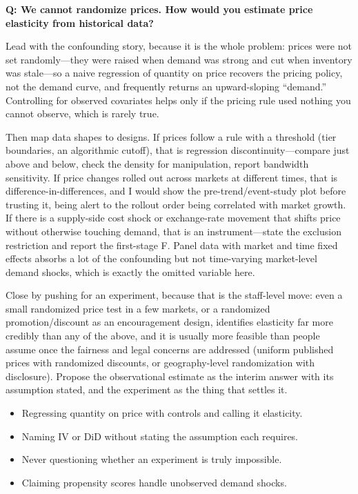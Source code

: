 \begin{interviewq}
\textbf{Q: We cannot randomize prices. How would you estimate price elasticity from historical data?}

 \quad {} \quad \badgefreq{\freqmed}

\stronganswer

Lead with the confounding story, because it is the whole problem: prices were not set randomly---they were raised when demand was strong and cut when inventory was stale---so a naive regression of quantity on price recovers the pricing policy, not the demand curve, and frequently returns an upward-sloping ``demand.'' Controlling for observed covariates helps only if the pricing rule used nothing you cannot observe, which is rarely true.

Then map data shapes to designs. If prices follow a rule with a threshold (tier boundaries, an algorithmic cutoff), that is regression discontinuity---compare just above and below, check the density for manipulation, report bandwidth sensitivity. If price changes rolled out across markets at different times, that is difference-in-differences, and I would show the pre-trend/event-study plot before trusting it, being alert to the rollout order being correlated with market growth. If there is a supply-side cost shock or exchange-rate movement that shifts price without otherwise touching demand, that is an instrument---state the exclusion restriction and report the first-stage F. Panel data with market and time fixed effects absorbs a lot of the confounding but not time-varying market-level demand shocks, which is exactly the omitted variable here.

Close by pushing for an experiment, because that is the staff-level move: even a small randomized price test in a few markets, or a randomized promotion/discount as an encouragement design, identifies elasticity far more credibly than any of the above, and it is usually more feasible than people assume once the fairness and legal concerns are addressed (uniform published prices with randomized discounts, or geography-level randomization with disclosure). Propose the observational estimate as the interim answer with its assumption stated, and the experiment as the thing that settles it.

\redflags
\begin{itemize}
    \item Regressing quantity on price with controls and calling it elasticity.
    \item Naming IV or DiD without stating the assumption each requires.
    \item Never questioning whether an experiment is truly impossible.
    \item Claiming propensity scores handle unobserved demand shocks.
\end{itemize}


\end{interviewq}
